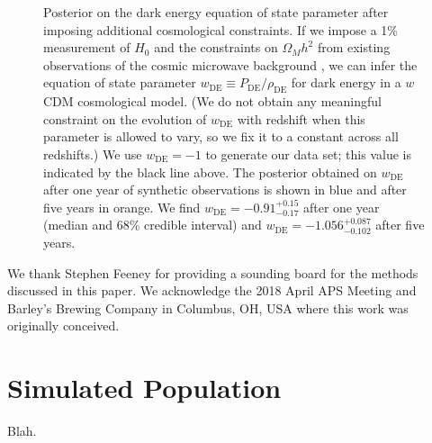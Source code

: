 \documentclass[modern]{aastex62}
\newcommand{\wDE}{w_\mathrm{DE}}
\newcommand{\wDEOneYear}{-0.91^{+0.15}_{-0.17}}
\newcommand{\wDEFiveYear}{-1.056^{+0.087}_{-0.102}}
\begin{document}
\begin{figure}
%
  \caption{\label{fig:wDE} Posterior on the dark energy equation of state
  parameter after imposing additional cosmological constraints.  If we impose a
  1\% measurement of $H_0$ \citep{Chen2017,Mortlock2018} and the constraints on
  $\Omega_M h^2$ from existing observations of the cosmic microwave background
  \citep{Planck2016}, we can infer the equation of state parameter $\wDE{}
  \equiv P_\mathrm{DE} / \rho_\mathrm{DE}$ for dark energy in a $w$CDM
  cosmological model.  (We do not obtain any meaningful constraint on the
  evolution of $\wDE{}$ with redshift when this parameter is allowed to vary, so
  we fix it to a constant across all redshifts.)  We use $\wDE{} = -1$ to
  generate our data set; this value is indicated by the black line above.  The
  posterior obtained on $\wDE{}$ after one year of synthetic observations is
  shown in blue and after five years in orange.  We find $\wDE{} =
  \wDEOneYear{}$ after one year (median and 68\% credible interval) and $\wDE{}
  = \wDEFiveYear{}$ after five years.}
%
\end{figure}

\acknowledgments

We thank Stephen Feeney for providing a sounding board for the methods discussed
in this paper.  We acknowledge the 2018 April APS Meeting and Barley's Brewing
Company in Columbus, OH, USA where this work was originally conceived.



\appendix

\section{Simulated Population}
\label{sec:simulated-population}

Blah.
\end{document}
